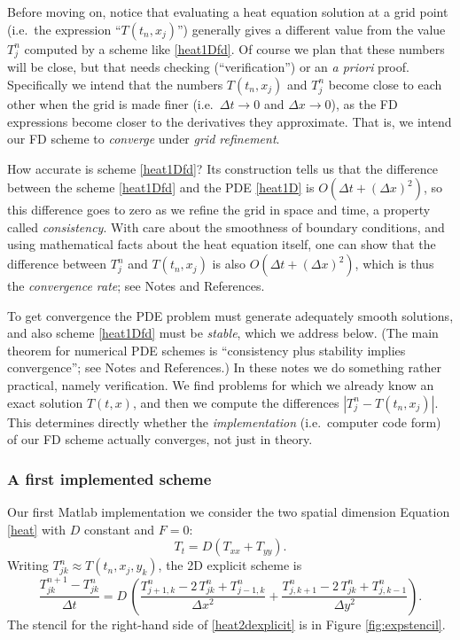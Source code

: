 \documentclass[letterpaper,final,12pt,reqno]{amsart}
\begin{document}
Before moving on, notice that evaluating a heat equation solution at a grid point (i.e.~the expression ``$T(t_n,x_j)$'') generally gives a different value from the value $T_j^n$ computed by a scheme like \eqref{heat1Dfd}.  Of course we plan that these numbers will be close, but that needs checking (``verification'') or an \emph{a priori} proof.  Specifically we intend that the numbers $T(t_n,x_j)$ and $T_j^n$ become close to each other when the grid is made finer (i.e.~$\Delta t \to 0$ and $\Delta x \to 0$), as the FD expressions become closer to the derivatives they approximate.  That is, we intend our FD scheme to \emph{converge} under \emph{grid refinement}.

How accurate is scheme \eqref{heat1Dfd}?  Its construction tells us that the difference between the scheme \eqref{heat1Dfd} and the PDE \eqref{heat1D} is $O(\Delta t + (\Delta x)^2)$, so this difference goes to zero as we refine the grid in space and time, a property called \emph{consistency}.  With care about the smoothness of boundary conditions, and using mathematical facts about the heat equation itself, one can show that the difference between $T_j^n$ and $T(t_n,x_j)$ is also $O(\Delta t + (\Delta x)^2)$, which is thus the \emph{convergence rate}; see Notes and References.

To get convergence the PDE problem must generate adequately smooth solutions, and also scheme \eqref{heat1Dfd} must be \emph{stable}, which we address below.  (The main theorem for numerical PDE schemes is ``consistency plus stability implies convergence''; see Notes and References.)  In these notes we do something rather practical, namely verification.  We find problems for which we already know an exact solution $T(t,x)$, and then we compute the differences $|T_j^n - T(t_n,x_j)|$.  This determines directly whether the \emph{implementation} (i.e.~computer code form) of our FD scheme actually converges, not just in theory.

\subsubsection*{A first implemented scheme}  Our first Matlab implementation we consider the two spatial dimension Equation \eqref{heat} with $D$ constant and $F=0$:
\begin{equation}
T_t = D (T_{xx}+T_{yy}).\label{heat2D}
\end{equation}
Writing $T_{jk}^n \approx T(t_n,x_j,y_k)$, the 2D explicit scheme is
\begin{equation}
	\frac{T_{jk}^{n+1} - T_{jk}^n}{\Delta t} = D\,\left(\frac{T_{j+1,k}^n - 2\, T_{jk}^n + T_{j-1,k}^n}{\Delta x^2} + \frac{T_{j,k+1}^n - 2\, T_{jk}^n + T_{j,k-1}^n}{\Delta y^2}\right). \label{heat2dexplicit}
\end{equation}
The stencil for the right-hand side of \eqref{heat2dexplicit} is in Figure \ref{fig:expstencil}.
\end{document}
